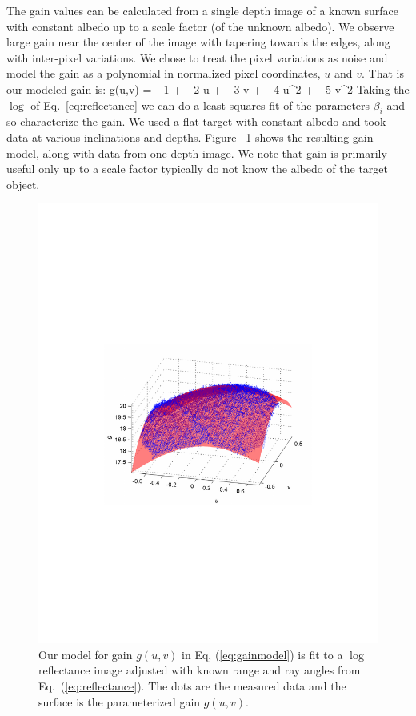 The gain values can be calculated from a single depth image of a known surface with constant albedo up to a scale factor (of the unknown albedo).  We observe large gain near the center of the image with tapering towards the edges, along with inter-pixel variations.  We chose to treat the pixel variations as noise and model the gain as a polynomial in normalized pixel coordinates, $u$ and $v$.  That is our modeled gain is:
\beq
g(u,v) = \beta_1 + \beta_2 u + \beta_3 v + \beta_4 u^2 + \beta_5 v^2 \label{eq:gainmodel}
\eeq
Taking the $\log$ of Eq.~\ref{eq:reflectance} we can do a least squares fit of the parameters $\beta_i$ and so characterize the gain.  We used a flat target with constant albedo and took data at various inclinations and depths. Figure ~\ref{fig:gain} shows the resulting gain model, along with data from one depth image.  We note that gain is primarily useful only up to a scale factor typically do not know the albedo of the target object.  

\begin{figure}
\begin{center}
   \includegraphics[trim=100 250 100 250,clip,width=0.95\linewidth]{Figures/gain}
\end{center}
   \caption{Our model for gain $g(u,v)$ in Eq, (\ref{eq:gainmodel}) is fit to a $\log$ reflectance image adjusted with known range and ray angles from Eq.~(\ref{eq:reflectance}).  The dots are the measured data and the surface is the parameterized gain $g(u,v)$. }
\label{fig:gain}
\end{figure}


